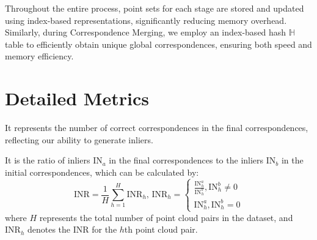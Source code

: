 Throughout the entire process, point sets for each stage are stored and updated using index-based representations, significantly reducing memory overhead. Similarly, during Correspondence Merging, we employ an index-based hash $\mathbb{H}$ table to efficiently obtain unique global correspondences, ensuring both speed and memory efficiency.

\section{Detailed Metrics}

 It represents the number of correct correspondences in the final correspondences, reflecting our ability to generate inliers.

 It is the ratio of inliers $\mathrm{IN}_{a}$ in the final correspondences to the inliers $\mathrm{IN}_{b}$ in the initial correspondences, which can be calculated by:
\begin{equation}
    \mathrm{INR} = \frac{1}{H} \sum_{h=1}^H \mathrm{INR}_h,\,  \mathrm{INR}_h = 
    \begin{cases}
        \frac{\mathrm{IN}^{a}_h}{\mathrm{IN}^{b}_h}, \mathrm{IN}^{b}_h\neq 0\\
        \mathrm{IN}^{a}_h, \mathrm{IN}^{b}_h = 0
    \end{cases}
 \end{equation}
where $H$ represents the total number of point cloud pairs in the dataset, and 
$\mathrm{INR}_h$ denotes the INR for the $h$th point cloud pair.

